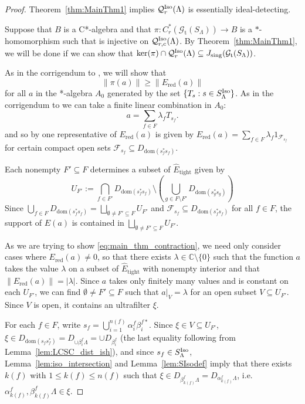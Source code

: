 \documentclass[12pt]{amsart}
\theoremstyle{definition}
\theoremstyle{remark}
\numberwithin{equation}{section}
\newcommand{\CC}{\mathbb{C}}
\newcommand{\Q}{\mathcal{Q}}
\renewcommand{\L}{\Lambda}
\renewcommand{\a}{\alpha}
\renewcommand{\b}{\beta}
\newcommand{\dom}{\text{dom}}
\newcommand{\Et}{\widehat E_{\text{tight}}}
\newcommand{\gt}{\mathcal{G}_{\text{t}}}
\newcommand{\cF}{\mathcal{F}}
\newcommand{\Iso}{\textup{Iso}}
\newcommand{\Ered}{E_{\text{red}}}
\newcommand{\Js}{J_{\text{sing}}}
\begin{document}
	\begin{proof} Theorem~\ref{thm:MainThm1} implies $\Q^\Iso_{r}(\L)$ is essentially ideal-detecting. 
		
		Suppose that $B$ is a C*-algebra and that $\pi: C^*_r(\gt(S_\L))\to B$ is a $*$-homomorphism such that is injective on $\Q^\Iso_{r,c}(\L)$. By Theorem~\ref{thm:MainThm1}, we will be done if we can show that $\ker(\pi)\cap\Q^\Iso_{r}(\L)\subseteq \Js(\gt(S_\L))$. 
		
		As in the corrigendum to \cite{St22}, we will show that \begin{equation}\label{eq:main_thm_contraction}
			\|\pi(a)\| \geq \|\Ered(a)\|
		\end{equation}for all $a$ in the *-algebra $A_0$ generated by the set $\{T_{s}: s\in S_\L^\Iso\}$.
			As in the corrigendum \cite{BS24} to \cite{St22} we can take a finite linear combination in $A_0$:
			\begin{equation}
			a = \sum_{f\in F}\lambda_fT_{s_f}.
			\end{equation}
		and so by \cite[Proposition~3.14]{EP16} one representative of $\Ered(a)$ is given by $\Ered(a) = \sum_{f\in F}\lambda_f1_{\cF_{s_f}}$ for certain compact open sets $\cF_{s_f}\subseteq D_{\dom(s_f^*s_f)}$.
		
		Each nonempty $F'\subseteq F$ determines a subset of $\Et$ given by
		\[
		U_{F'} := \bigcap_{f\in F'}D_{\dom(s_f^*s_f)} \setminus \left(\bigcup_{g\in F\setminus F'} D_{\dom(s_g^*s_g)}\right)
		\] 
		 Since $\bigcup_{f\in F}D_{\dom(s^*_fs_f)}=\bigsqcup_{\emptyset\neq F'\subseteq F}U_{F'}$ and $\cF_{s_f}\subseteq D_{\dom(s^*_fs_f)}$ for all $f\in F$, the support of $E(a)$ is contained in $\bigsqcup_{\emptyset\neq F'\subseteq F}U_{F'}$. 
		
		As we are trying to show \eqref{eq:main_thm_contraction}, we need only consider cases where $\Ered(a)\neq 0$, so that there exists $\lambda\in \CC\setminus\{0\}$ such that the function $a$ takes the value $\lambda$ on a subset of $\Et$ with nonempty interior and that $\|\Ered(a)\| = |\lambda|$. Since $a$ takes only finitely many values and is constant on each $U_{F'}$, we can find $\emptyset\neq F'\subseteq F$ such that $a|_V =  \lambda$ for an open subset $V\subseteq U_{F'}$. Since $V$ is open, it contains an ultrafilter $\xi$. 
		
		For each $f\in F$, write $s_f = \bigcup_{i=1}^{n(f)}\a^f_i\b_i^{f*}$. Since $\xi\in V \subseteq U_{F'}$, $\xi\in D_{\dom(s_fs_f^*)} = D_{\cup\b^f_i\L} = \cup D_{\b^f_i}$ (the last equality following from Lemma~\ref{lem:LCSC_dist_ish}), and since $s_f\in S_\L^\Iso$, Lemma~\ref{lem:iso_intersection} and Lemma~\ref{lem:SIsodef} imply that there exists $k(f)$ with $1\leq k(f)\leq n(f)$ such that $\xi\in D_{\b^f_{k(f)}\L} = D_{\a^f_{k(f)}\L}$, i.e. $\a^f_{k(f)},\b^f_{k(f)}\L\in \xi$. 
		

\end{proof}
\end{document}
